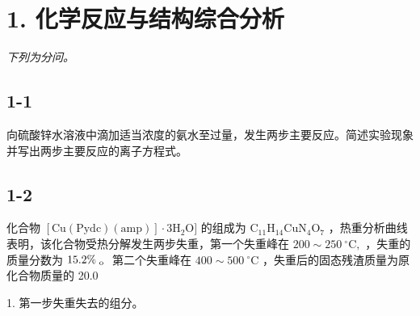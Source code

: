 \section*{1. 化学反应与结构综合分析}
\textit{下列为分问。}

\subsection*{1-1}
向硫酸锌⽔溶液中滴加适当浓度的氨⽔⾄过量，发⽣两步主要反应。简述实验现象并写出两步主要反应的离⼦⽅程式。

\subsection*{1-2}
化合物 $[ \mathrm { C u ( P y d c ) ( a m p ) } ] { \cdot } 3 \mathrm { H } _ { 2 } \mathrm { O } ]$ 的组成为 $\mathrm { C _ { 1 1 } H _ { 1 4 } C u N _ { 4 } O _ { 7 } }$ ，热重分析曲线表明，该化合物受热分解发⽣两步失重，第⼀个失重峰在 $2 0 0 { \sim } 2 5 0 \ ^ { \circ } \mathrm { C } ,$ ，失重的质量分数为 $1 5 . 2 \% _ { \textmd { o } }$ 第⼆个失重峰在 $4 0 0 { \sim } 5 0 0 \ ^ { \circ } \mathrm { C }$ ，失重后的固态残渣质量为原化合物质量的 20.0%

1. 第⼀步失重失去的组分。

